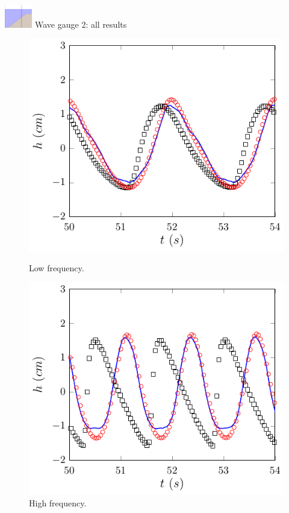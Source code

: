 \documentclass[pdf]{beamer}
\begin{document}
\begin{frame}{\includegraphics[width=1.2cm]{./Pics/WT2z.pdf} \hspace{1cm} Wave gauge 2: all results  }
	\begin{figure}
		\centering
		\begin{minipage}{.5\textwidth}
			\centering
			\includegraphics[width=0.9\linewidth]{./Pics/SL/WG2/1-figure0.pdf}
			\caption{Low frequency.}
		\end{minipage}%
		\begin{minipage}{.5\textwidth}
			\centering
			\includegraphics[width=0.9\linewidth]{./Pics/SH/WG2/1-figure0.pdf}
			\caption{High frequency.}
		\end{minipage}
	\end{figure}
\end{frame}
\end{document}
